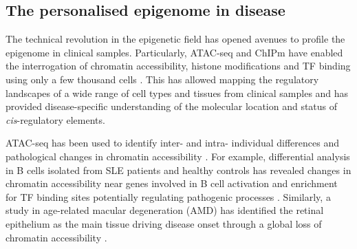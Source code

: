 \subsection{The personalised epigenome in disease}

The technical revolution in the epigenetic field has opened avenues to profile the epigenome in clinical samples. Particularly, ATAC-seq and ChIPm have enabled the interrogation of chromatin accessibility, histone modifications and TF binding using only a few thousand cells \parencite{Buenrostro2013, Schmidl2015}. This has allowed mapping the regulatory landscapes of a wide range of cell types and tissues from clinical samples and has provided disease-specific understanding of the molecular location and status of \textit{cis}-regulatory elements. 


ATAC-seq has been used to identify inter- and intra- individual differences and pathological changes in chromatin accessibility \parencite{Qu2015}. For example, differential analysis in B cells isolated from SLE patients and healthy controls has revealed changes in chromatin accessibility near genes involved in B cell activation and enrichment for TF binding sites potentially regulating pathogenic processes \parencite{Scharer2016}. Similarly, a study in age-related macular degeneration (AMD) has identified the retinal epithelium as the main tissue driving disease onset through a global loss of chromatin accessibility \parencite{Wang2018}. %

